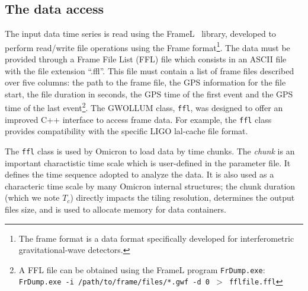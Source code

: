 \subsection{The data access} \label{sec:algorithm:data}
The input data time series is read using the FrameL~\cite{FrameL} library, developed to perform read/write file operations using the Frame format\footnote{The frame format is a data format specifically developed for interferometric gravitational-wave detectors.}. The data must be provided through a Frame File List (FFL) file which consists in an ASCII file with the file extension ``.ffl''. This file must contain a list of frame files described over five columns: the path to the frame file, the GPS information for the file start, the file duration in seconds, the GPS time of the first event and the GPS time of the last event\footnote{A FFL file can be obtained using the FrameL program \texttt{FrDump.exe}: \texttt{FrDump.exe -i /path/to/frame/files/*.gwf -d 0 $>$ fflfile.ffl}}. The GWOLLUM class, \texttt{ffl}, was designed to offer an improved C++ interface to access frame data. For example, the \texttt{ffl} class provides compatibility with the specific LIGO lal-cache file format.

The \texttt{ffl} class is used by Omicron to load data by time chunks. The \textit{chunk} is an important charactistic time scale which is user-defined in the parameter file. It defines the time sequence adopted to analyze the data. It is also used as a characteric time scale by many Omicron internal structures; the chunk duration (which we note $T_c$) directly impacts the tiling resolution, determines the output files size, and is used to allocate memory for data containers.


